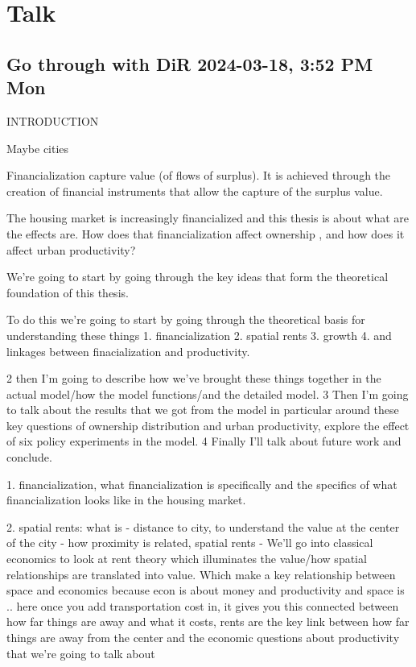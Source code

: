 \chapter{Talk}

\section{Go through with DiR 2024-03-18, 3:52 PM Mon}

INTRODUCTION

Maybe cities

Financialization capture value (of flows of surplus). It is achieved through the creation of financial instruments that allow the capture of the surplus value. 

The housing market is increasingly financialized and this thesis is about what are the effects are. How does that financialization affect ownership , and how does it affect urban productivity?

We’re going to start by going through the key ideas that form the theoretical foundation of this thesis.


To do this we’re going to start by going through the theoretical basis for understanding these things
1. financialization
2. spatial rents
3. growth
4. and linkages between finacialization and productivity.
 
 2 then I'm going to describe how we've brought these things together in the actual model/how the model functions/and the detailed model.
 3 Then I'm going to talk about the results that we got from the model in particular around these key questions of ownership distribution and urban productivity, explore the effect of six policy experiments in the model. 
 4 Finally I'll talk about future work and conclude.



1. financialization, what financialization is  specifically  and  the specifics of what financialization looks like in the housing market.

2. spatial rents: what is - distance to city, to understand the value at the center of the city - how proximity is related, spatial rents - We'll go into classical economics to look at rent theory which illuminates the value/how spatial relationships are translated into value. Which make a key relationship between space and economics because econ is about money and productivity and space is .. here once you add transportation cost in, it gives you this connected between how far things are away and what it costs, rents are the key link between how far things are away from the center and the economic questions about productivity  that we're going to talk about

